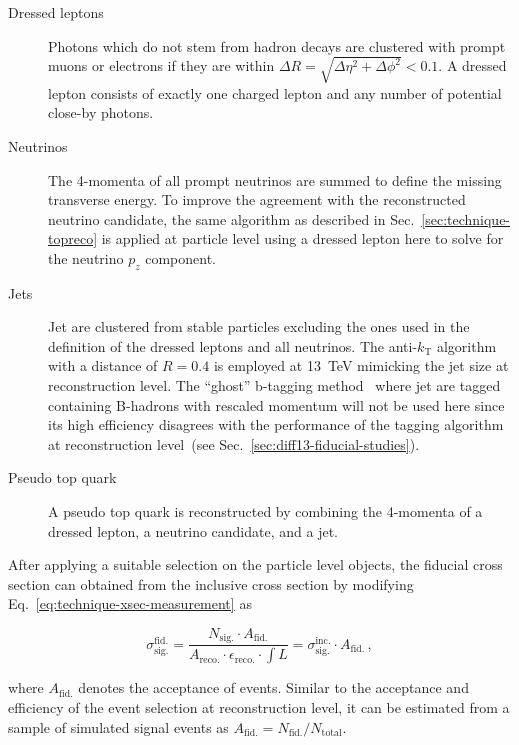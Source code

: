 \begin{description}
\item[Dressed leptons] Photons which do not stem from hadron decays are clustered with prompt muons or electrons if they are within $\Delta R=\sqrt{\Delta\eta^2+\Delta\phi^2}<0.1$. A dressed lepton consists of exactly one charged lepton and any number of potential close-by photons.
\item[Neutrinos] The 4-momenta of all prompt neutrinos are summed to define the missing transverse energy. To improve the agreement with the reconstructed neutrino candidate, the same algorithm as described in Sec.~\ref{sec:technique-topreco} is applied at particle level using a dressed lepton here to solve for the neutrino $p_{z}$ component.
\item[Jets] Jet are clustered from stable particles excluding the ones used in the definition of the dressed leptons and all neutrinos. The anti-$k_\mathrm{T}$ algorithm with a distance of $R=0.4$ is employed at 13~TeV mimicking the jet size at reconstruction level. The ``ghost'' b-tagging method~\cite{Cacciari:2008gn} where jet are tagged containing B-hadrons with rescaled momentum will not be used here since its high efficiency disagrees with the performance of the tagging algorithm at reconstruction level~(see Sec.~\ref{sec:diff13-fiducial-studies}).
\item[Pseudo top quark] A pseudo top quark is reconstructed by combining the 4-momenta of a dressed lepton, a neutrino candidate, and a jet.
\end{description}

After applying a suitable selection on the particle level objects, the fiducial cross section can obtained from the inclusive cross section by modifying Eq.~\ref{eq:technique-xsec-measurement} as

\begin{equation}
\sigma_\mathrm{sig.}^\mathrm{fid.}=\frac{N_\mathrm{sig.}\cdot A_\mathrm{fid.}}{A_\mathrm{reco.}\cdot\epsilon_\mathrm{reco.}\cdot{\textstyle{\int}L}} =\sigma_\mathrm{sig.}^\mathrm{inc.}\cdot A_\mathrm{fid.}\,,
\end{equation}

where $A_\mathrm{fid.}$ denotes the acceptance of events. Similar to the acceptance and efficiency of the event selection at reconstruction level, it can be estimated from a sample of simulated signal events as $A_\mathrm{fid.}=N_\mathrm{fid.}/N_\mathrm{total}$. 



